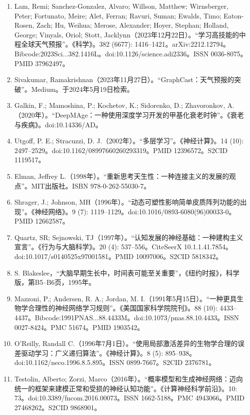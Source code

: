 \begin{enumerate}
\item Lam, Remi; Sanchez-Gonzalez, Alvaro; Willson, Matthew; Wirnsberger, Peter; Fortunato, Meire; Alet, Ferran; Ravuri, Suman; Ewalds, Timo; Eaton-Rosen, Zach; Hu, Weihua; Merose, Alexander; Hoyer, Stephan; Holland, George; Vinyals, Oriol; Stott, Jacklynn（2023年12月22日）。“学习高技能的中程全球天气预报”。《科学》。382 (6677): 1416–1421。arXiv:2212.12794。Bibcode:2023Sci...382.1416L。doi:10.1126/science.adi2336。ISSN 0036-8075。PMID 37962497。
\item Sivakumar, Ramakrishnan（2023年11月27日）。“GraphCast：天气预报的突破”。Medium。于2024年5月19日检索。
\item Galkin, F.; Mamoshina, P.; Kochetov, K.; Sidorenko, D.; Zhavoronkov, A.（2020年）。“DeepMAge：一种使用深度学习开发的甲基化衰老时钟”。《衰老与疾病》。doi:10.14336/AD。
\item Utgoff, P. E.; Stracuzzi, D. J.（2002年）。“多层学习”。《神经计算》。14 (10): 2497–2529。doi:10.1162/08997660260293319。PMID 12396572。S2CID 1119517。
\item Elman, Jeffrey L.（1998年）。“重新思考天生性：一种连接主义的发展的观点”。MIT出版社。ISBN 978-0-262-55030-7。
\item Shrager, J.; Johnson, MH（1996年）。“动态可塑性影响简单皮质阵列功能的出现”。《神经网络》。9 (7): 1119–1129。doi:10.1016/0893-6080(96)00033-0。PMID 12662587。
\item Quartz, SR; Sejnowski, TJ（1997年）。“认知发展的神经基础：一种建构主义宣言”。《行为与大脑科学》。20 (4): 537–556。CiteSeerX 10.1.1.41.7854。doi:10.1017/s0140525x97001581。PMID 10097006。S2CID 5818342。
\item S. Blakeslee，“大脑早期生长中，时间表可能至关重要”，《纽约时报》，科学版，第B5–B6页，1995年。
\item Mazzoni, P.; Andersen, R. A.; Jordan, M. I.（1991年5月15日）。“一种更具生物学合理性的神经网络学习规则”。《美国国家科学院院刊》。88 (10): 4433–4437。Bibcode:1991PNAS...88.4433M。doi:10.1073/pnas.88.10.4433。ISSN 0027-8424。PMC 51674。PMID 1903542。
\item O'Reilly, Randall C.（1996年7月1日）。“使用局部激活差异的生物学合理的误差驱动学习：广义递归算法”。《神经计算》。8 (5): 895–938。doi:10.1162/neco.1996.8.5.895。ISSN 0899-7667。S2CID 2376781。
\item Testolin, Alberto; Zorzi, Marco（2016年）。“概率模型和生成神经网络：迈向统一的框架来建模正常和受损的神经认知功能”。《计算神经科学前沿》。10: 73。doi:10.3389/fncom.2016.00073。ISSN 1662-5188。PMC 4943066。PMID 27468262。S2CID 9868901。

\end{enumerate}
